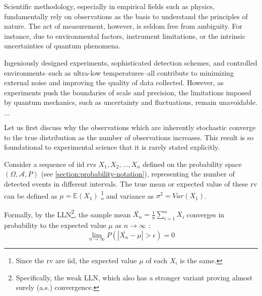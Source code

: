 Scientific methodology, especially in empirical fields such as physics, fundamentally rely on observations as the basis to understand the principles of nature. The act of measurement, however, is seldom free from ambiguity. For instance, due to environmental factors, instrument limitations, or the intrinsic uncertainties of quantum phenomena. 

Ingeniously designed experiments, sophisticated detection schemes, and controlled environments--such as ultra-low temperatures--all contribute to minimizing external noise and improving the quality of data collected. However, as experiments push the boundaries of scale and precision, the limitations imposed by quantum mechanics, such as uncertainty and fluctuations, remain unavoidable.

$\dots$





Let us first discuss why the observations which are inherently stochastic converge to the true distribution as the number of observations increases. This result is so foundational to experimental science that it is rarely stated explicitly.

Consider a sequence of \gls{iid} \glspl{rv} $X_1, X_2, \dots, X_n$ defined on the probability space $(\Omega, \mathcal{A}, P)$ (see \cref{section:probability-notation}), representing the number of detected events in different intervals. The true mean or expected value of these \gls{rv} can be defined as $\mu = \mathbb{E}(X_1)$
\footnote{Since the \gls{rv} are \gls{iid}, the expected value $\mu$ of each $X_i$ is the same.} 
and variance as $\sigma^2 = Var(X_1)$.

Formally, by the \gls{LLN}\footnote{Specifically, the weak \gls{LLN}, which also has a stronger variant proving almost surely (a.s.) convergence.}, the sample mean $\bar{X_n} = \frac{1}{n} \sum_{i=1}^{n} X_i$ converges in probability to the expected value $\mu$ as $n \to \infty$ \cite{fellerIntroductionProbabilityTheory1968}:
\begin{equation}
    \lim_{n \to \infty} P(|\bar{X_n} - \mu| > \epsilon) = 0
\end{equation}

